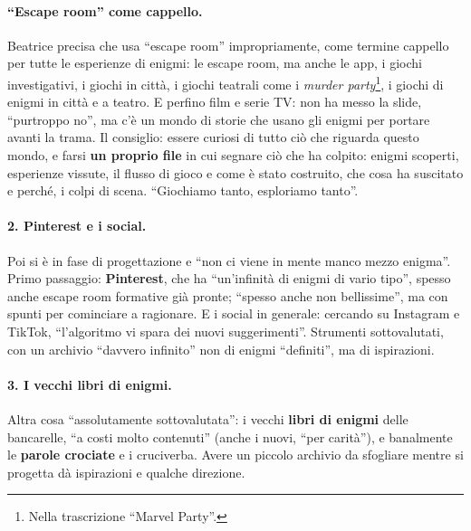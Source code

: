 \paragraph{``Escape room'' come cappello.} Beatrice precisa che usa ``escape room''
impropriamente, come termine cappello per tutte le esperienze di enigmi: le escape
room, ma anche le app, i giochi investigativi, i giochi in città, i giochi teatrali
come i \emph{murder party}\footnote{Nella trascrizione ``Marvel Party''.}, i giochi di
enigmi in città e a teatro. E perfino film e serie TV: non ha messo la slide, ``purtroppo
no'', ma c'è un mondo di storie che usano gli enigmi per portare avanti la trama. Il
consiglio: essere curiosi di tutto ciò che riguarda questo mondo, e farsi \textbf{un
proprio file} in cui segnare ciò che ha colpito: enigmi scoperti, esperienze vissute,
il flusso di gioco e come è stato costruito, che cosa ha suscitato e perché, i colpi
di scena. ``Giochiamo tanto, esploriamo tanto''.

\paragraph{2. Pinterest e i social.} Poi si è in fase di progettazione e ``non ci
viene in mente manco mezzo enigma''. Primo passaggio: \textbf{Pinterest}, che ha
``un'infinità di enigmi di vario tipo'', spesso anche escape room formative già pronte;
``spesso anche non bellissime'', ma con spunti per cominciare a ragionare. E i social
in generale: cercando su Instagram e TikTok, ``l'algoritmo vi spara dei nuovi
suggerimenti''. Strumenti sottovalutati, con un archivio ``davvero infinito'' non di
enigmi ``definiti'', ma di ispirazioni.

\paragraph{3. I vecchi libri di enigmi.} Altra cosa ``assolutamente sottovalutata'':
i vecchi \textbf{libri di enigmi} delle bancarelle, ``a costi molto contenuti'' (anche
i nuovi, ``per carità''), e banalmente le \textbf{parole crociate} e i cruciverba.
Avere un piccolo archivio da sfogliare mentre si progetta dà ispirazioni e qualche
direzione.

